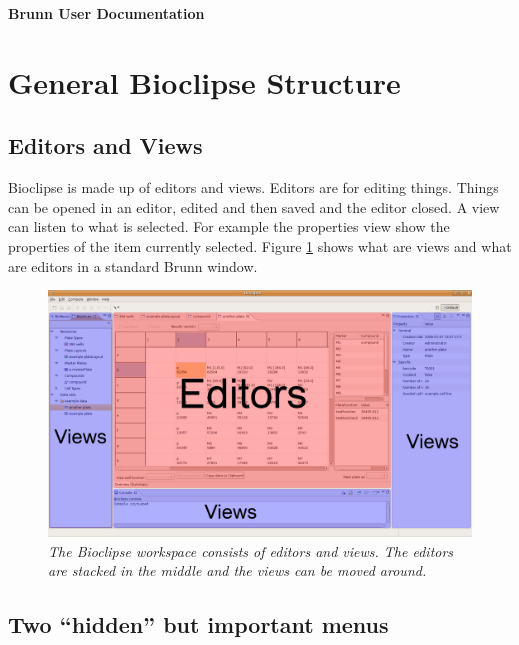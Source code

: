 \documentclass[a4paper,10pt]{article}
\begin{document}
    \huge 
    \noindent
    \textbf{Brunn User Documentation}

    \normalsize

    \section{General Bioclipse Structure}

        \subsection{Editors and Views}
            Bioclipse is made up of editors and views. Editors are for editing
            things. Things can be opened in an editor, edited and then saved
            and the editor closed. A view can listen to what is selected. For
            example the properties view show the properties of the item
            currently selected. Figure \ref{editorsAndViews} shows what are
            views and what are editors in a standard Brunn window.
            \begin{figure}[htbp]
                \begin{center}
                    \includegraphics[width=1\textwidth]{images/EditorsViews.png}
                \end{center}
                \caption{\textit{The Bioclipse workspace consists of editors
                                 and views. The editors are stacked in the
                                 middle and the views can be moved around.}}
                \label{editorsAndViews}
            \end{figure}

        \subsection{Two ``hidden'' but important menus}
\end{document}

